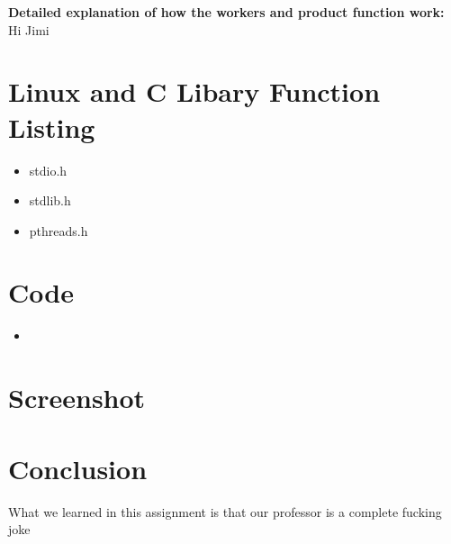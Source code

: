 \documentclass{article}
\newcommand{\insertcode}[2]{
\begin{itemize}
\item[]
\end{itemize}
}
\begin{document}
\textbf{\Large{Detailed explanation of how the workers and product function work:}}\\

Hi Jimi
\clearpage


\section{Linux and C Libary Function Listing}
\begin{itemize}
    \item stdio.h
    \item stdlib.h
    \item pthreads.h
\end{itemize}
\clearpage



\section{Code}
\insertcode{main}{Matrix Multiplication of nxn matrices using p\_threads}
\clearpage


\section{Screenshot}
\begin{center}
\end{center}
\clearpage



\section{Conclusion}
What we learned in this assignment is that our professor is a complete fucking joke
\end{document}
